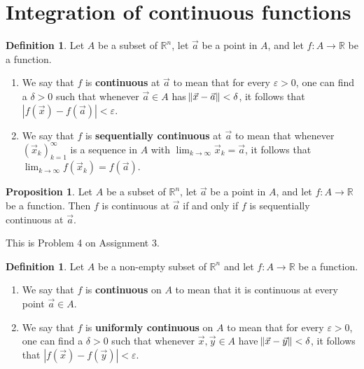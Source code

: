 \documentclass[11pt]{article}
\makeatletter
\theoremstyle{definition}
\newtheorem{defn}[thm]{Definition}
\newtheorem{prop}[thm]{Proposition}
\newcommand{\R}{\ensuremath{\mathbb{R}}}
\newenvironment{pf}[1][\proofname]{\par
  \pushQED{\qed}%
  \normalfont \topsep0\p@\relax
  \trivlist
  \item[\hskip\labelsep\itshape
  #1\@addpunct{.}]\ignorespaces
}{%
  \popQED\endtrivlist\@endpefalse
}
\makeatother
\begin{document}
\newpage
\section{Integration of continuous functions}

\begin{defn}
Let $A$ be a subset of $\R^n$, let $\vec{a}$ be a point in $A$, and let $f : A \to \R$ be a function. \vspace{-1.5ex}
\begin{enumerate}[(1)]
    \item We say that $f$ is {\bf continuous} at $\vec{a}$ to mean that for every $\varepsilon > 0$, one can find a $\delta > 0$ such that whenever $\vec{a} \in A$ has $\norm{\vec{x} - \vec{a}} < \delta$, it follows that $|f(\vec{x}) - f(\vec{a})| < \varepsilon$.
    
    \item We say that $f$ is {\bf sequentially continuous} at $\vec{a}$ to mean that whenever $(\vec{x}_k)_{k=1}^\infty$ is a sequence in $A$ with $\lim_{k\to\infty} \vec{x}_k = \vec{a}$, it follows that $\lim_{k\to\infty} f(\vec{x}_k) = f(\vec{a})$.
\end{enumerate}
\end{defn}

\begin{prop}
Let $A$ be a subset of $\R^n$, let $\vec{a}$ be a point in $A$, and let $f : A \to \R$ be a function. Then $f$ is continuous at $\vec{a}$ if and only if $f$ is sequentially continuous at $\vec{a}$.
\end{prop}
\begin{pf}
This is Problem 4 on Assignment 3.
\end{pf}

\begin{defn}
Let $A$ be a non-empty subset of $\R^n$ and let $f : A \to \R$ be a function. \vspace{-1.5ex}
\begin{enumerate}[(1)]
\item We say that $f$ is {\bf continuous} on $A$ to mean that it is continuous at every point $\vec{a} \in A$.
\item We say that $f$ is {\bf uniformly continuous} on $A$ to mean that for every $\varepsilon > 0$, one can find a $\delta > 0$ such that whenever $\vec{x}, \vec{y} \in A$ have $\norm{\vec{x} - \vec{y}} < \delta$, it follows that $|f(\vec{x}) - f(\vec{y})| < \varepsilon$.
\end{enumerate}
\end{defn}
\end{document}
